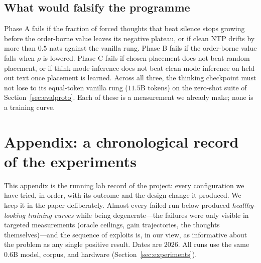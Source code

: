 \documentclass{article} %
\begin{document}
\subsection{What would falsify the programme}
\label{sec:falsify}

Phase A fails if the fraction of forced thoughts that beat silence stops growing before the order-borne value leaves its negative plateau, or if clean NTP drifts by more than $0.5$ nats against the vanilla rung. Phase B fails if the order-borne value falls when $\rho$ is lowered. Phase C fails if chosen placement does not beat random placement, or if think-mode inference does not beat clean-mode inference on held-out text once placement is learned. Across all three, the thinking checkpoint must not lose to its equal-token vanilla rung ($11.5$B tokens) on the zero-shot suite of Section~\ref{sec:evalproto}. Each of these is a measurement we already make; none is a training curve.

\section{Appendix: a chronological record of the experiments}
\label{app:history}

This appendix is the running lab record of the project: every configuration we have tried, in order, with its outcome and the design change it produced. We keep it in the paper deliberately. Almost every failed run below produced \emph{healthy-looking training curves} while being degenerate---the failures were only visible in targeted measurements (oracle ceilings, gain trajectories, the thoughts themselves)---and the sequence of exploits is, in our view, as informative about the problem as any single positive result. Dates are 2026. All runs use the same 0.6B model, corpus, and hardware (Section~\ref{sec:experiments}).
\end{document}

